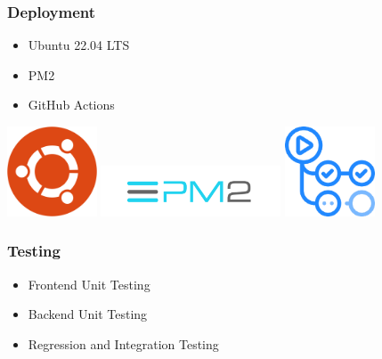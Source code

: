\documentclass{beamer}
\begin{document}
\begin{frame}
    \frametitle{Deployment}
    \begin{block}{}
        \begin{itemize}
            \item Ubuntu 22.04 LTS
            \item PM2
            \item GitHub Actions
        \end{itemize}
    \end{block}
    \vspace{0.75cm}
    \centering
    \includegraphics[scale=0.2, width=0.2\textwidth]{res/ubuntu_logo.png} \hfill
    \includegraphics[width=0.4\textwidth]{res/pm2_logo.png} \hfill
    \includegraphics[width=0.2\textwidth]{res/github_actions_logo.png} \hfill
\end{frame}

\begin{frame}
    \frametitle{Testing}
    \begin{itemize}
        \item Frontend Unit Testing \pause
        \item Backend Unit Testing \pause
        \item Regression and Integration Testing
    \end{itemize}
\end{frame}
\end{document}
